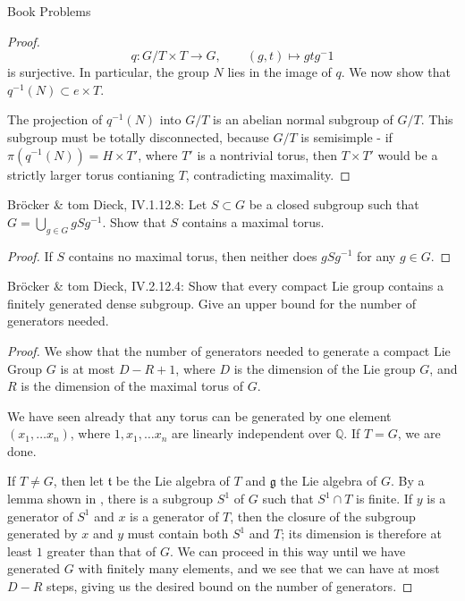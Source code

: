 \documentclass[12pt]{article}
\theoremstyle{definition}
\newenvironment{problem}[2][Problem]{\begin{trivlist}
\item[\hskip \labelsep {\bfseries #1}\hskip \labelsep {\bfseries #2.}]}{\end{trivlist}}
\begin{document}
\begin{section}{Book Problems}
\begin{problem}{2}
\begin{proof}
			\[q: G/T \times T \to G, \qquad (g, t)\mapsto gtg^-1\]
			is surjective. In particular, the group $N$ lies in the image of $q$. We now show that $q^{-1}(N) \subset e \times T$.
			\par The projection of $q^{-1}(N)$ into $G/T$ is an abelian normal subgroup of $G/T$. This subgroup must be totally disconnected, because $G/T$ is semisimple - if $\pi(q^{-1}(N)) = H \times T'$, where $T'$ is a nontrivial torus, then $T \times T'$ would be a strictly larger torus contianing $T$, contradicting maximality. 
		\end{proof}
	\end{problem}
	\begin{problem}{3}
		Br\"ocker \& tom Dieck, IV.1.12.8: Let $S \subset G$ be a closed subgroup such that $G = \bigcup_{g \in G}gSg^{-1}$. Show that $S$ contains a maximal torus.
		\begin{proof}
			If $S$ contains no maximal torus, then neither does $gSg^{-1}$ for any $g \in G$. 
		\end{proof}
	\end{problem}
	\begin{problem}{4}
		Br\"ocker \& tom Dieck, IV.2.12.4: Show that every compact Lie group contains a finitely generated dense subgroup. Give an upper bound for the number of generators needed.
		\begin{proof}
			We show that the number of generators needed to generate a compact Lie Group $G$ is at most $D - R + 1$, where $D$ is the dimension of the Lie group $G$, and $R$ is the dimension of the maximal torus of $G$.
			\par We have seen already that any torus can be generated by one element $(x_1, \dots x_n)$, where $1, x_1, \dots x_n$ are linearly independent over $\mathbb{Q}$. If $T = G$, we are done.
			\par If $T \neq G$, then let $\mathfrak t$ be the Lie algebra of $T$ and $\mathfrak g$ the Lie algebra of $G$. By a lemma shown in \cite{devito}, there is a subgroup $S^1$ of $G$ such that $S^1 \cap T$ is finite. If $y$ is a generator of $S^1$ and $x$ is a generator of $T$, then the closure of the subgroup generated by $x$ and $y$ must contain both $S^1$ and $T$; its dimension is therefore at least $1$ greater than that of $G$. We can proceed in this way until we have generated $G$ with finitely many elements, and we see that we can have at most $D - R$ steps, giving us the desired bound on the number of generators.
		\end{proof}
	\end{problem}

\end{section}
\end{document}
